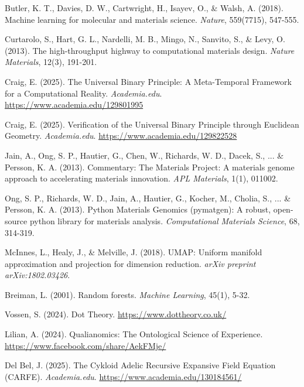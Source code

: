 \documentclass[12pt,a4paper]{article}
\begin{document}

\begin{thebibliography}{99}

Butler, K. T., Davies, D. W., Cartwright, H., Isayev, O., \& Walsh, A. (2018). Machine learning for molecular and materials science. \textit{Nature}, 559(7715), 547-555.

Curtarolo, S., Hart, G. L., Nardelli, M. B., Mingo, N., Sanvito, S., \& Levy, O. (2013). The high-throughput highway to computational materials design. \textit{Nature Materials}, 12(3), 191-201.

Craig, E. (2025). The Universal Binary Principle: A Meta-Temporal Framework for a Computational Reality. \textit{Academia.edu}. \url{https://www.academia.edu/129801995}

Craig, E. (2025). Verification of the Universal Binary Principle through Euclidean Geometry. \textit{Academia.edu}. \url{https://www.academia.edu/129822528}

Jain, A., Ong, S. P., Hautier, G., Chen, W., Richards, W. D., Dacek, S., ... \& Persson, K. A. (2013). Commentary: The Materials Project: A materials genome approach to accelerating materials innovation. \textit{APL Materials}, 1(1), 011002.

Ong, S. P., Richards, W. D., Jain, A., Hautier, G., Kocher, M., Cholia, S., ... \& Persson, K. A. (2013). Python Materials Genomics (pymatgen): A robust, open-source python library for materials analysis. \textit{Computational Materials Science}, 68, 314-319.

McInnes, L., Healy, J., \& Melville, J. (2018). UMAP: Uniform manifold approximation and projection for dimension reduction. \textit{arXiv preprint arXiv:1802.03426}.

Breiman, L. (2001). Random forests. \textit{Machine Learning}, 45(1), 5-32.

Vossen, S. (2024). Dot Theory. \url{https://www.dottheory.co.uk/}

Lilian, A. (2024). Qualianomics: The Ontological Science of Experience. \url{https://www.facebook.com/share/AekFMje/}

Del Bel, J. (2025). The Cykloid Adelic Recursive Expansive Field Equation (CARFE). \textit{Academia.edu}. \url{https://www.academia.edu/130184561/}

\end{thebibliography}
\end{document}
